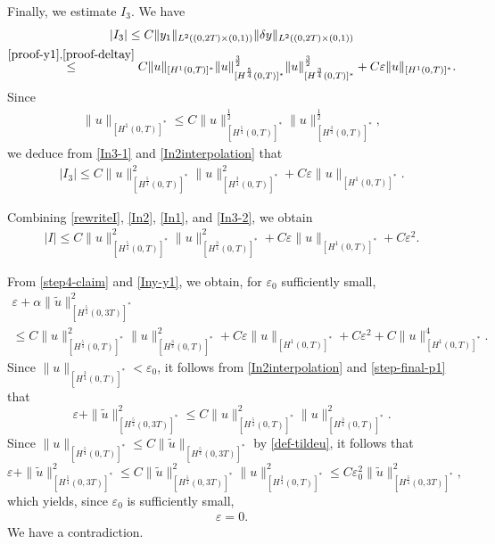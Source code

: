 \documentclass[11pt, reqno]{amsart}
\newcommand{\eps}{\varepsilon}
\newcommand{\tu}{\widetilde{u}}
\theoremstyle{plain}
\numberwithin{equation}{section}
\newcommand{\be}{\begin{equation}}
\newcommand{\ee}{\end{equation}}
\begin{document}
Finally, we estimate $I_3$. We have
\begin{multline}
	|I_3| \leq C \|y_1\|_{L^2((0, 2T) \times (0, 1))} \|\delta y\|_{L^2((0, 2T) \times (0, 1))} \\
	\overset{\eqref{proof-y1}, \eqref{proof-deltay}}{\leq} C  \|u\|_{[H^1(0, T)]^*}   \|u\|_{[H^{\frac{5}{4}}(0, T)]^*}^{\frac{3}{2}} \|u\|_{[H^{\frac{3}{4}}(0, T)]^*}^{\frac{3}{2}} + C \varepsilon \|u\|_{[H^1(0, T)]^*}. \label{In3-1}
\end{multline}
Since
\begin{align}	\label{In2interpolation}
	\|u\|_{[H^1(0, T)]^*} \leq C \|u\|_{[H^{\frac{5}{4}}(0, T)]^*}^{\frac{1}{2}} \|u\|_{[H^{\frac{3}{4}}(0, T)]^*}^{\frac{1}{2}}, 
\end{align}
we deduce from \eqref{In3-1} and \eqref{In2interpolation} that 
	\begin{align}	\label{In3-2}
	|I_3| \leq  C \|u\|_{[H^{\frac{5}{4}}(0, T)]^*}^2 \|u\|_{[H^{\frac{3}{4}}(0, T)]^*}^2 + C \varepsilon \|u\|_{[H^1(0, T)]^*}.
	\end{align}

Combining \eqref{rewriteI}, \eqref{In2}, \eqref{In1}, and \eqref{In3-2}, we obtain \begin{align} \label{Iny-y1}
   |I| \leq C \|u\|_{[H^{\frac{5}{4}}(0, T)]^*}^2 \|u\|_{[H^{\frac{3}{4}}(0, T)]^*}^2 + C \varepsilon \|u\|_{[H^1(0, T)]^*} + C \eps^2. 
    \end{align}   

  
  From \eqref{step4-claim} and \eqref{Iny-y1}, we obtain, for $\varepsilon_0$ sufficiently small,
    \begin{multline} \label{step-final-p1}
      \varepsilon + \alpha \| \tu \|^2_{[H^{\frac{5}{4}}(0, 3T)]^*} \\[6pt]
      \le  C \|u\|_{[H^{\frac{5}{4}}(0, T)]^*}^2 \|u\|_{[H^{\frac{3}{4}}(0, T)]^*}^2 + C \varepsilon \|u\|_{[H^1(0, T)]^*} + C \eps^2 + C  \|u\|_{[H^1(0, T)]^*}^4. 
    \end{multline}
    Since $\| u\|_{[H^{\frac{3}{4}}(0, T)]^*} < \eps_0$, it follows from \eqref{In2interpolation} and \eqref{step-final-p1} that
\be
\eps +  \| \tu \|_{[H^{\frac{5}{4}}(0, 3T)]^*}^2 \le C   \|u\|_{[H^{\frac{5}{4}}(0, T)]^*}^2 \|u\|_{[H^{\frac{3}{4}}(0, T)]^*}^2.
\ee
Since $\|u\|_{[H^{\frac{5}{4}}(0,T)]^*} \leq C \|\tu \|_{[H^{\frac{5}{4}}(0, 3T)]^*}$ by \eqref{def-tildeu}, it follows that 
\be
\eps + \| \tu \|_{[H^{\frac{5}{4}}(0, 3T)]^*}^2 \le C \| \tu \|_{[H^{\frac{5}{4}}(0, 3T)]^*}^2 \| u \|_{[H^{\frac{3}{4}}(0, T)]^*}^2 \le C \eps_0^2 \| \tu \|_{[H^{\frac{5}{4}}(0, 3T)]^*}^2, 
\ee
which yields, since $\eps_0$ is sufficiently small, 
\begin{align}
\eps = 0.
\end{align}
We have a contradiction. 
\end{document}
